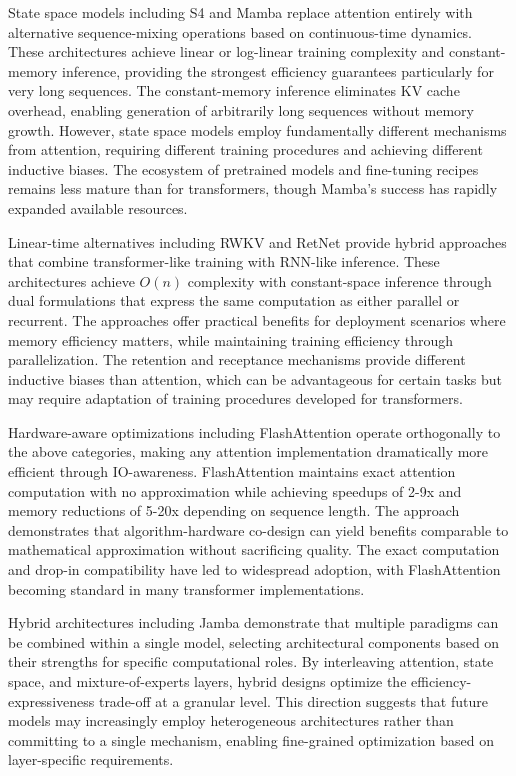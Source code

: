 \documentclass[11pt,letterpaper]{article}
\begin{document}
State space models including S4 and Mamba replace attention entirely with alternative sequence-mixing operations based on continuous-time dynamics. These architectures achieve linear or log-linear training complexity and constant-memory inference, providing the strongest efficiency guarantees particularly for very long sequences. The constant-memory inference eliminates KV cache overhead, enabling generation of arbitrarily long sequences without memory growth. However, state space models employ fundamentally different mechanisms from attention, requiring different training procedures and achieving different inductive biases. The ecosystem of pretrained models and fine-tuning recipes remains less mature than for transformers, though Mamba's success has rapidly expanded available resources.

Linear-time alternatives including RWKV and RetNet provide hybrid approaches that combine transformer-like training with RNN-like inference. These architectures achieve $O(n)$ complexity with constant-space inference through dual formulations that express the same computation as either parallel or recurrent. The approaches offer practical benefits for deployment scenarios where memory efficiency matters, while maintaining training efficiency through parallelization. The retention and receptance mechanisms provide different inductive biases than attention, which can be advantageous for certain tasks but may require adaptation of training procedures developed for transformers.

Hardware-aware optimizations including FlashAttention operate orthogonally to the above categories, making any attention implementation dramatically more efficient through IO-awareness. FlashAttention maintains exact attention computation with no approximation while achieving speedups of 2-9x and memory reductions of 5-20x depending on sequence length. The approach demonstrates that algorithm-hardware co-design can yield benefits comparable to mathematical approximation without sacrificing quality. The exact computation and drop-in compatibility have led to widespread adoption, with FlashAttention becoming standard in many transformer implementations.

Hybrid architectures including Jamba demonstrate that multiple paradigms can be combined within a single model, selecting architectural components based on their strengths for specific computational roles. By interleaving attention, state space, and mixture-of-experts layers, hybrid designs optimize the efficiency-expressiveness trade-off at a granular level. This direction suggests that future models may increasingly employ heterogeneous architectures rather than committing to a single mechanism, enabling fine-grained optimization based on layer-specific requirements.
\end{document}

